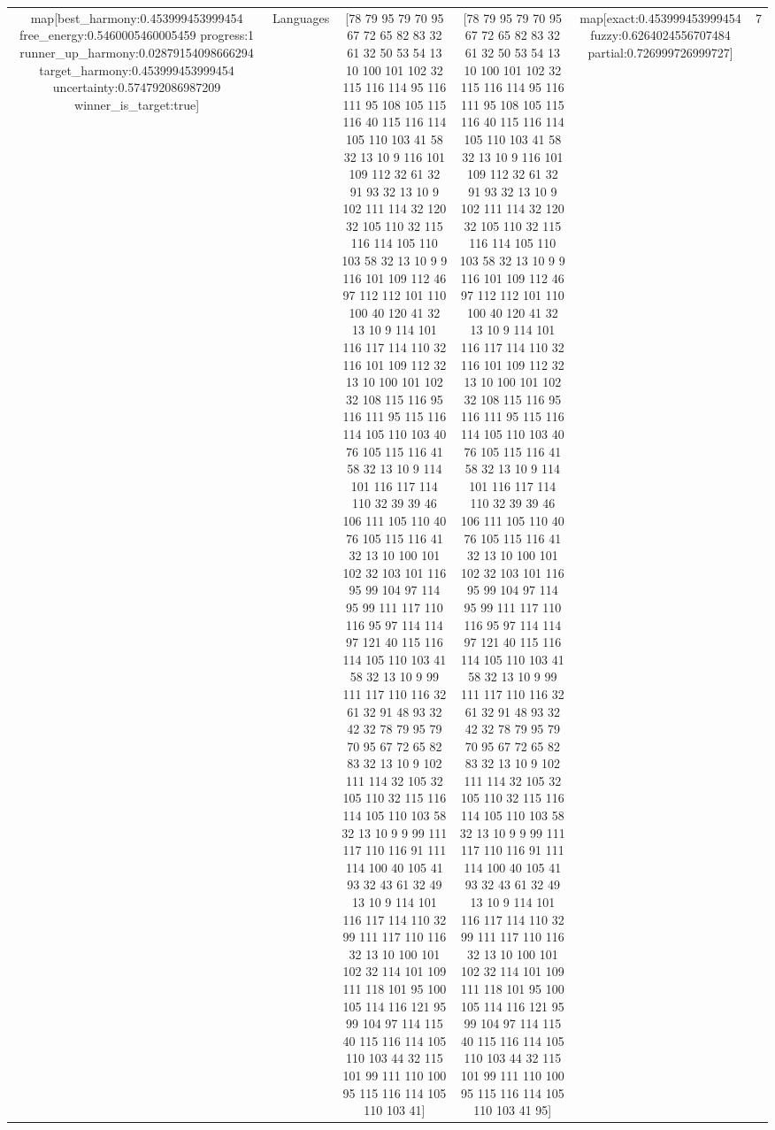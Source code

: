 \begin{table}[h]
\begin{tabular}{ |c|c|c|c|c|c| }
\hline
map[best_harmony:0.453999453999454 free_energy:0.5460005460005459 progress:1 runner_up_harmony:0.02879154098666294 target_harmony:0.453999453999454 uncertainty:0.574792086987209 winner_is_target:true] & Languages & [78 79 95 79 70 95 67 72 65 82 83 32 61 32 50 53 54 13 10 100 101 102 32 115 116 114 95 116 111 95 108 105 115 116 40 115 116 114 105 110 103 41 58 32 13 10 9 116 101 109 112 32 61 32 91 93 32 13 10 9 102 111 114 32 120 32 105 110 32 115 116 114 105 110 103 58 32 13 10 9 9 116 101 109 112 46 97 112 112 101 110 100 40 120 41 32 13 10 9 114 101 116 117 114 110 32 116 101 109 112 32 13 10 100 101 102 32 108 115 116 95 116 111 95 115 116 114 105 110 103 40 76 105 115 116 41 58 32 13 10 9 114 101 116 117 114 110 32 39 39 46 106 111 105 110 40 76 105 115 116 41 32 13 10 100 101 102 32 103 101 116 95 99 104 97 114 95 99 111 117 110 116 95 97 114 114 97 121 40 115 116 114 105 110 103 41 58 32 13 10 9 99 111 117 110 116 32 61 32 91 48 93 32 42 32 78 79 95 79 70 95 67 72 65 82 83 32 13 10 9 102 111 114 32 105 32 105 110 32 115 116 114 105 110 103 58 32 13 10 9 9 99 111 117 110 116 91 111 114 100 40 105 41 93 32 43 61 32 49 13 10 9 114 101 116 117 114 110 32 99 111 117 110 116 32 13 10 100 101 102 32 114 101 109 111 118 101 95 100 105 114 116 121 95 99 104 97 114 115 40 115 116 114 105 110 103 44 32 115 101 99 111 110 100 95 115 116 114 105 110 103 41] & [78 79 95 79 70 95 67 72 65 82 83 32 61 32 50 53 54 13 10 100 101 102 32 115 116 114 95 116 111 95 108 105 115 116 40 115 116 114 105 110 103 41 58 32 13 10 9 116 101 109 112 32 61 32 91 93 32 13 10 9 102 111 114 32 120 32 105 110 32 115 116 114 105 110 103 58 32 13 10 9 9 116 101 109 112 46 97 112 112 101 110 100 40 120 41 32 13 10 9 114 101 116 117 114 110 32 116 101 109 112 32 13 10 100 101 102 32 108 115 116 95 116 111 95 115 116 114 105 110 103 40 76 105 115 116 41 58 32 13 10 9 114 101 116 117 114 110 32 39 39 46 106 111 105 110 40 76 105 115 116 41 32 13 10 100 101 102 32 103 101 116 95 99 104 97 114 95 99 111 117 110 116 95 97 114 114 97 121 40 115 116 114 105 110 103 41 58 32 13 10 9 99 111 117 110 116 32 61 32 91 48 93 32 42 32 78 79 95 79 70 95 67 72 65 82 83 32 13 10 9 102 111 114 32 105 32 105 110 32 115 116 114 105 110 103 58 32 13 10 9 9 99 111 117 110 116 91 111 114 100 40 105 41 93 32 43 61 32 49 13 10 9 114 101 116 117 114 110 32 99 111 117 110 116 32 13 10 100 101 102 32 114 101 109 111 118 101 95 100 105 114 116 121 95 99 104 97 114 115 40 115 116 114 105 110 103 44 32 115 101 99 111 110 100 95 115 116 114 105 110 103 41 95] & map[exact:0.453999453999454 fuzzy:0.6264024556707484 partial:0.726999726999727] & 7 \\

\end{tabular}
\end{table}

